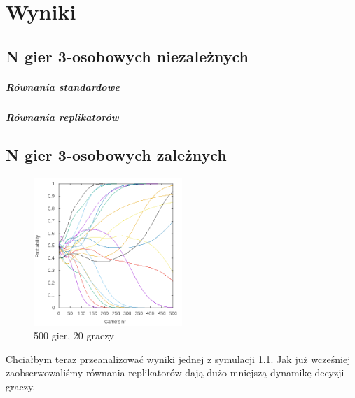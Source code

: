 \chapter{Wyniki}
\label{cha:wyniki}

\section{N gier 3-osobowych niezależnych}
\label{sec:N3nzal}

\paragraph{Równania standardowe}
\label{sec:r_stan}

\paragraph{Równania replikatorów}
\label{sec:r_repl}

\section{N gier 3-osobowych zależnych}
\label{sec:N3zal}
\begin{figure}
    \centering
    \includegraphics[width=0.5\textwidth]{pict/wyniki/g500p20}   
    \caption{500 gier, 20 graczy}
	\label{fig:podst} 
\end{figure}

Chciałbym teraz przeanalizować wyniki jednej z symulacji \ref{fig:podst}. Jak już wcześniej zaobserwowaliśmy równania replikatorów dają dużo mniejszą dynamikę decyzji graczy.

